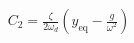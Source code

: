 \documentclass[preview]{standalone}
\begin{document}
\begin{align*}
C_2 = \frac{\zeta}{2\omega_d} (y_{\text{eq}} - \frac{g}{\omega^2})
\end{align*}
\end{document}
